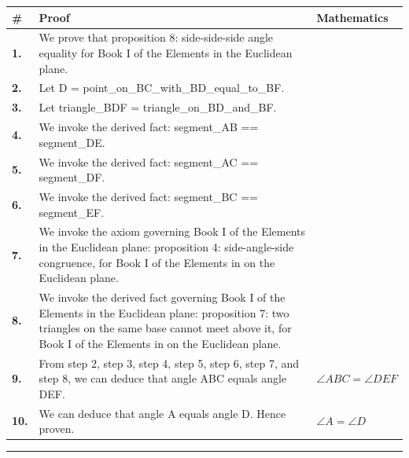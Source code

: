 \documentclass[11pt]{article}
\theoremstyle{definition}
\begin{document}
\begin{tabular}{@{} >{\raggedright\arraybackslash}p{} >{\raggedright\arraybackslash}p{} >{\raggedleft\arraybackslash}p{} @{}}
\textbf{\#} & \textbf{Proof} & \textbf{Mathematics} \\
\midrule
\textbf{1.} & We prove that proposition 8: side-side-side angle equality for Book I of the Elements in the Euclidean plane. & \\[0.45em]
\textbf{2.} & Let D = point\_on\_BC\_with\_BD\_equal\_to\_BF. & \\[0.45em]
\textbf{3.} & Let triangle\_BDF = triangle\_on\_BD\_and\_BF. & \\[0.45em]
\textbf{4.} & We invoke the derived fact: segment\_AB == segment\_DE. & \\[0.45em]
\textbf{5.} & We invoke the derived fact: segment\_AC == segment\_DF. & \\[0.45em]
\textbf{6.} & We invoke the derived fact: segment\_BC == segment\_EF. & \\[0.45em]
\textbf{7.} & We invoke the axiom governing Book I of the Elements in the Euclidean plane: proposition 4: side-angle-side congruence, for Book I of the Elements in on the Euclidean plane. & \\[0.45em]
\textbf{8.} & We invoke the derived fact governing Book I of the Elements in the Euclidean plane: proposition 7: two triangles on the same base cannot meet above it, for Book I of the Elements in on the Euclidean plane. & \\[0.45em]
\textbf{9.} & From step 2, step 3, step 4, step 5, step 6, step 7, and step 8, we can deduce that angle ABC equals angle DEF. & $\displaystyle \angle ABC = \angle DEF$ \\[0.45em]
\textbf{10.} & We can deduce that angle A equals angle D. Hence proven. & $\displaystyle \angle A = \angle D$ \\[0.45em]
\bottomrule
\end{tabular}
\label{thm:Geometry-Euclid Book I-proposition_8_side_side_side_angle_equality}
\par\medskip\hrule
\end{document}

